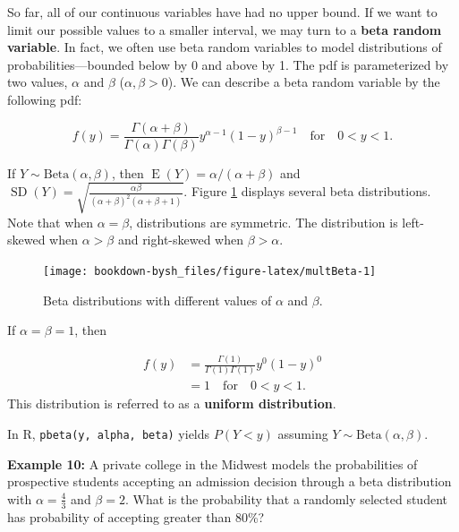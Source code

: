 \documentclass[
]{krantz}
\newcommand{\E}{\operatorname{E}}
\newcommand{\SD}{\operatorname{SD}}
\begin{document}
So far, all of our continuous variables have had no upper bound. If we want to limit our possible values to a smaller interval, we may turn to a \textbf{beta random variable}. In fact, we often use beta random variables to model distributions of probabilities---bounded below by 0 and above by 1. The pdf is parameterized by two values, \(\alpha\) and \(\beta\) (\(\alpha, \beta > 0\)). We can describe a beta random variable by the following pdf:

\begin{equation}
f(y) = \frac{\Gamma(\alpha + \beta)}{\Gamma(\alpha)\Gamma(\beta)} y^{\alpha-1} (1-y)^{\beta-1} \quad \textrm{for} \quad 0 < y < 1.
\label{eq:betaRV}
\end{equation}

If \(Y \sim \textrm{Beta}(\alpha, \beta)\), then \(\E(Y) = \alpha/(\alpha + \beta)\) and \(\SD(Y) = \displaystyle \sqrt{\frac{\alpha \beta}{(\alpha + \beta)^2 (\alpha+\beta+1)}}\). Figure \ref{fig:multBeta} displays several beta distributions.  Note that when \(\alpha = \beta\), distributions are symmetric. The distribution is left-skewed when \(\alpha > \beta\) and right-skewed when \(\beta > \alpha\).



\begin{figure}

{\centering \texttt{[image: bookdown-bysh\_files/figure-latex/multBeta-1]} 

}

\caption{Beta distributions with different values of \(\alpha\) and \(\beta\).}\label{fig:multBeta}
\end{figure}

If \(\alpha = \beta = 1\), then

\begin{align*}
 f(y) &= \frac{\Gamma(1)}{\Gamma(1)\Gamma(1)}y^0(1-y)^0 \\
      &= 1 \quad \textrm{for} \quad 0 < y < 1.
\end{align*}
This distribution is referred to as a \textbf{uniform distribution}.

In R, \texttt{pbeta(y,\ alpha,\ beta)} yields \(P(Y < y)\) assuming \(Y \sim \textrm{Beta}(\alpha, \beta)\).

\textbf{Example 10:} A private college in the Midwest models the probabilities of prospective students accepting an admission decision through a beta distribution with \(\alpha = \frac{4}{3}\) and \(\beta = 2\). What is the probability that a randomly selected student has probability of accepting greater than 80\%?
\end{document}
